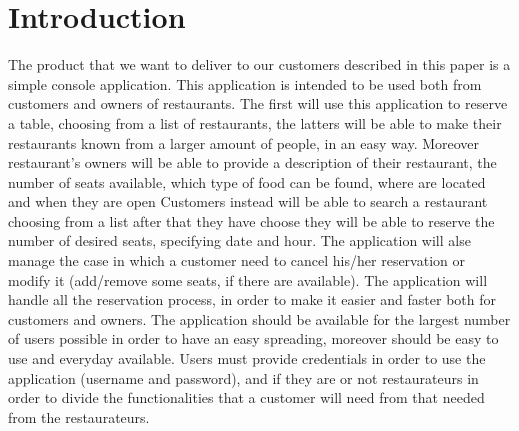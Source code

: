\chapter{Introduction}
The product that we want to deliver to our customers described in this paper is
a simple console application. This application is intended to be used
both from customers and owners of restaurants. The first will use this
application to
reserve a table, choosing from a list of restaurants, the latters will be able to
make their restaurants known from a larger amount of people, in an easy way.
Moreover restaurant's owners will be able to provide a description of their
restaurant, the number of seats available, which type of food can be found, where
are located and when they are open
Customers instead will be able to search a restaurant choosing from a list after that they have choose they will 
be able to reserve the number of desired seats, specifying  date and hour.
The application will alse manage the case in which a customer need
to cancel his/her reservation or modify it (add/remove some seats, if there are
available).
The application will handle all the reservation process, in order to make it
easier and faster both for customers and owners. The application should be
available for the largest number of users possible in order to have an easy spreading, 
moreover should be easy to use and everyday available.
Users must provide credentials in order to use the application (username and password),
and if they are or not restaurateurs in order to divide the functionalities that a customer
will need from that needed from the restaurateurs.
